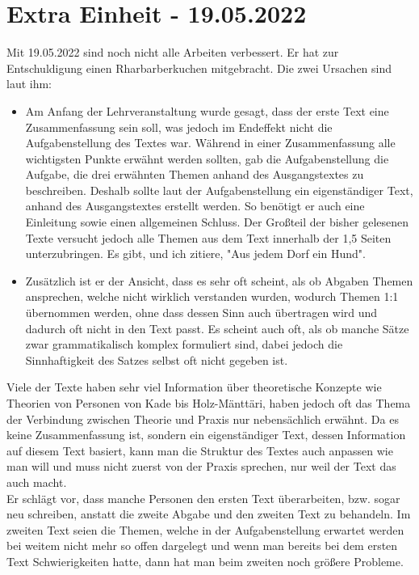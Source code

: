 \documentclass{article}
\begin{document}
	\section{Extra Einheit - 19.05.2022}

	Mit 19.05.2022 sind noch nicht alle Arbeiten verbessert. Er hat zur Entschuldigung einen Rharbarberkuchen mitgebracht. Die zwei Ursachen sind laut ihm:
	\begin{itemize}
		\item{Am Anfang der Lehrveranstaltung wurde gesagt, dass der erste Text eine Zusammenfassung sein soll, was jedoch im Endeffekt nicht die Aufgabenstellung des Textes war. Während in einer Zusammenfassung alle wichtigsten Punkte erwähnt werden sollten, gab die Aufgabenstellung die Aufgabe, die drei erwähnten Themen anhand des Ausgangstextes zu beschreiben. Deshalb sollte laut der Aufgabenstellung ein eigenständiger Text, anhand des Ausgangstextes erstellt werden. So benötigt er auch eine Einleitung sowie einen allgemeinen Schluss. Der Großteil der bisher gelesenen Texte versucht jedoch alle Themen aus dem Text innerhalb der 1,5 Seiten unterzubringen. Es gibt, und ich zitiere, "Aus jedem Dorf ein Hund".}
		\item{Zusätzlich ist er der Ansicht, dass es sehr oft scheint, als ob Abgaben Themen ansprechen, welche nicht wirklich verstanden wurden, wodurch Themen 1:1 übernommen werden, ohne dass dessen Sinn auch übertragen wird und dadurch oft nicht in den Text passt. Es scheint auch oft, als ob manche Sätze zwar grammatikalisch komplex formuliert sind, dabei jedoch die Sinnhaftigkeit des Satzes selbst oft nicht gegeben ist.}
	\end{itemize}
	Viele der Texte haben sehr viel Information über theoretische Konzepte wie Theorien von Personen von Kade bis Holz-Mänttäri, haben jedoch oft das Thema der Verbindung zwischen Theorie und Praxis nur nebensächlich erwähnt. Da es keine Zusammenfassung ist, sondern ein eigenständiger Text, dessen Information auf diesem Text basiert, kann man die Struktur des Textes auch anpassen wie man will und muss nicht zuerst von der Praxis sprechen, nur weil der Text das auch macht. \\
	Er schlägt vor, dass manche Personen den ersten Text überarbeiten, bzw. sogar neu schreiben, anstatt die zweite Abgabe und den zweiten Text zu behandeln. Im zweiten Text seien die Themen, welche in der Aufgabenstellung erwartet werden bei weitem nicht mehr so offen dargelegt und wenn man bereits bei dem ersten Text Schwierigkeiten hatte, dann hat man beim zweiten noch größere Probleme. \\
\end{document}
